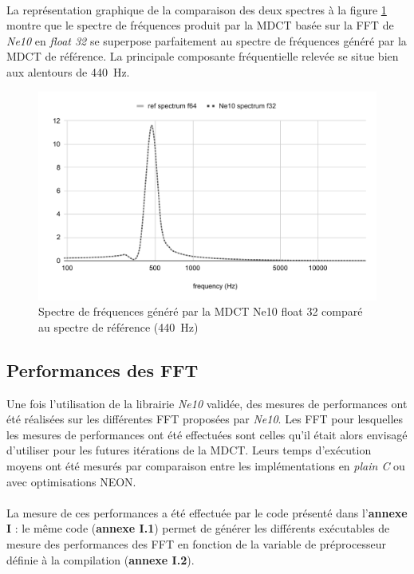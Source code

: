 \documentclass{article}
\begin{document}
    \paragraph{}
    La représentation graphique de la comparaison des deux spectres à la figure \ref{fig:validation_ne10_f32} montre que le spectre de fréquences produit par la MDCT basée sur la FFT de \emph{Ne10} en \emph{float 32} se superpose parfaitement au spectre de fréquences généré par la MDCT de référence. La principale composante fréquentielle relevée se situe bien aux alentours de \SI{440}{\hertz}.
    \begin{figure}[H]
        \centering
        \includegraphics[width=.8\linewidth]{./images/validation_ne10_f32.pdf}
        \caption{Spectre de fréquences généré par la MDCT Ne10 float 32 comparé au spectre de référence (\SI{440}{\hertz})}
        \label{fig:validation_ne10_f32}
    \end{figure}



    \subsection{Performances des FFT}
    \label{sec:fft_perfs}
    Une fois l'utilisation de la librairie \emph{Ne10} validée, des mesures de performances ont été réalisées sur les différentes FFT proposées par \emph{Ne10}. Les FFT pour lesquelles les mesures de performances ont été effectuées sont celles qu'il était alors envisagé d'utiliser pour les futures itérations de la MDCT. Leurs temps d'exécution moyens ont été mesurés par comparaison entre les implémentations en \emph{plain C} ou avec optimisations NEON.

    \paragraph{}
    La mesure de ces performances a été effectuée par le code présenté dans l'\textbf{annexe I} : le même code (\textbf{annexe I.1}) permet de générer les différents exécutables de mesure des performances des FFT en fonction de la variable de préprocesseur définie à la compilation (\textbf{annexe I.2}).
\end{document}
